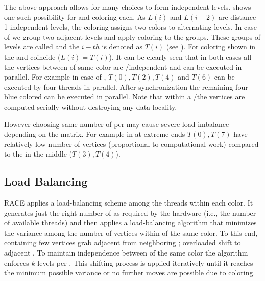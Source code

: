   \setlength{\belowcaptionskip}{0pt}
The above approach allows for many choices to form \DK independent levels.  shows 
one such possibility for \DONE and \DTWO coloring each. As $L(i)$ and $L(i\pm2)$ are
distance-1 independent levels, the \DONE coloring  assigns
two colors to alternating levels.  In case of \DTWO we group two adjacent levels and apply \DONE
coloring to the groups. These groups of levels are called \levelGroups
 and the $i-th$ \levelGroup is denoted as $T(i)$ (see ).
For \DONE coloring shown in  the \levels and \levelGroups
coincide ($L(i) = T(i)$).
It can be clearly seen that in both cases
 all the vertices  between \levelGroups of same color
  are \DONE/\DTWO independent  and can be executed in parallel.
   For example in case of \DTWO, \levelGroups $T(0), T(2), T(4)$
 and $T(6)$ can be executed by four threads in parallel. After synchronization the remaining 
 four blue colored \levelGroups can be executed in parallel. Note that
 within a \levelGroup/\level the vertices are computed serially without destroying
 any data locality.

However choosing same number of \levels per \levelGroup may cause severe
load imbalance depending on the matrix. For example in  
 \levelGroups at extreme ends $T(0), T(7)$  have relatively low number of 
 vertices (proportional to computational work)  compared to the \levelGroups 
 in the middle ($T(3),T(4)$).


\subsection{Load Balancing}
\Acrshort{RACE} applies a load-balancing scheme 
among the threads within each color.
It generates just the right number of \levelGroups 
as required by the hardware (i.e., the number of available threads)
and then applies a load-balancing algorithm that
minimizes the variance among the number of vertices 
within \levelGroups of the same color. To this end,
\levelGroups containing few vertices
grab adjacent \levels from neighboring \levelGroups; overloaded
\levelGroups shift \levels to adjacent \levelGroups. To maintain
\DK independence between \levelGroups of the same color the algorithm enforces \atleast $k$ levels per \levelGroup. This shifting process is applied iteratively until it
reaches the minimum possible variance or no further moves are possible due to
 \DK coloring.
 
